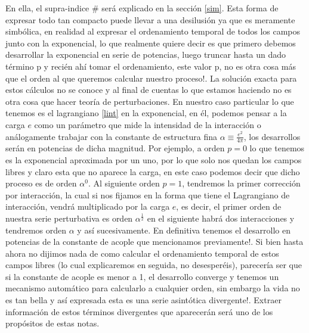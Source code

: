 \documentclass{article}
\numberwithin{equation}{section}
\begin{document}

En ella, el supra-indice $ \# $ será explicado en la sección \ref{sim}. Esta forma de expresar todo tan compacto puede llevar a una desilusión ya que es meramente simbólica, en realidad al expresar
el ordenamiento temporal de todos los campos junto con la exponencial,
lo que realmente quiere decir es que primero debemos desarrollar la
exponencial en serie de potencias, luego truncar hasta un dado término
p y recién ahí tomar el ordenamiento, este valor p, no es otra cosa más que el orden al que queremos
calcular nuestro proceso!. La solución exacta para estos cálculos no se conoce y al final de cuentas lo que estamos haciendo no es otra cosa que hacer teoría de perturbaciones. En nuestro caso particular lo que tenemos es el lagrangiano \ref{lint} en la exponencial, en él, podemos pensar a la carga $ e $ como un parámetro que mide la intensidad de la interacción o análogamente trabajar con la constante de estructura fina $\alpha\equiv$$\frac{e^{2}}{4\pi}$, los desarrollos serán en potencias de dicha magnitud. Por ejemplo, a orden $p=0$ lo que tenemos es la exponencial aproximada por un uno, por lo que solo nos quedan los campos libres y claro esta que no aparece la carga, en este caso podemos decir que dicho proceso es de orden $\alpha^{0}$. Al
siguiente orden $p=1$, tendremos la primer corrección por interacción,
la cual si nos fijamos en la forma que tiene el Lagrangiano de interacción, vendrá multiplicado
por la carga $ e $, es decir, el primer orden de nuestra serie perturbativa
es orden $\alpha^{\frac{1}{2}}$ en el siguiente habrá dos interacciones
y tendremos orden $\alpha$ y así sucesivamente. En definitiva tenemos
el desarrollo en potencias de la constante de acople que mencionamos
previamente!. Si bien hasta ahora no dijimos nada de como calcular
el ordenamiento temporal de estos campos libres (lo cual explicaremos
en seguida, no desesperéis), parecería ser que si la constante de
acople es menor a 1, el desarrollo converge y tenemos un mecanismo
automático para calcularlo a cualquier orden, sin embargo la vida
no es tan bella y así expresada esta es una serie asintótica divergente!.
Extraer información de estos términos divergentes que aparecerán será
uno de los propósitos de estas notas. 
\end{document}
